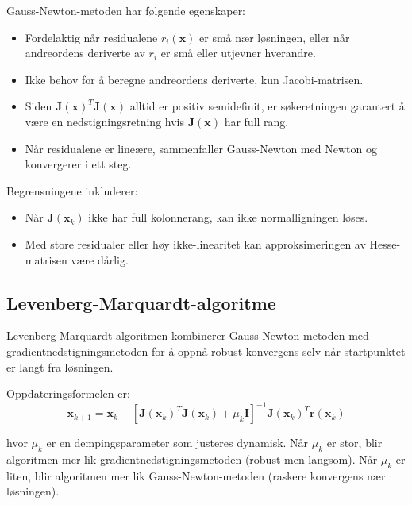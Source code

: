 Gauss-Newton-metoden har følgende egenskaper:
\begin{itemize}
	\item Fordelaktig når residualene $r_i(\symbf{x})$ er små nær løsningen, eller når andreordens deriverte av $r_i$ er små eller utjevner hverandre.
	\item Ikke behov for å beregne andreordens deriverte, kun Jacobi-matrisen.
	\item Siden $\symbf{J}(\symbf{x})^T \symbf{J}(\symbf{x})$ alltid er positiv semidefinit, er søkeretningen garantert å være en nedstigningsretning hvis $\symbf{J}(\symbf{x})$ har full rang.
	\item Når residualene er lineære, sammenfaller Gauss-Newton med Newton og konvergerer i ett steg.
\end{itemize}

Begrensningene inkluderer:
\begin{itemize}
	\item Når $\symbf{J}(\symbf{x}_k)$ ikke har full kolonnerang, kan ikke normalligningen løses.
	\item Med store residualer eller høy ikke-linearitet kan approksimeringen av Hesse-matrisen være dårlig.
\end{itemize}

\subsection{Levenberg-Marquardt-algoritme}
\label{subsec:levenberg_marquardt}

Levenberg-Marquardt-algoritmen kombinerer Gauss-Newton-metoden med gradientnedstigningsmetoden for å oppnå robust konvergens selv når startpunktet er langt fra løsningen.

Oppdateringsformelen er:
\begin{equation}
	\symbf{x}_{k+1} = \symbf{x}_k - [\symbf{J}(\symbf{x}_k)^T \symbf{J}(\symbf{x}_k) + \mu_k \symbf{I}]^{-1} \symbf{J}(\symbf{x}_k)^T \symbf{r}(\symbf{x}_k)
\end{equation}

hvor $\mu_k$ er en dempingsparameter som justeres dynamisk. Når $\mu_k$ er stor, blir algoritmen mer lik gradientnedstigningsmetoden (robust men langsom). Når $\mu_k$ er liten, blir algoritmen mer lik Gauss-Newton-metoden (raskere konvergens nær løsningen).
